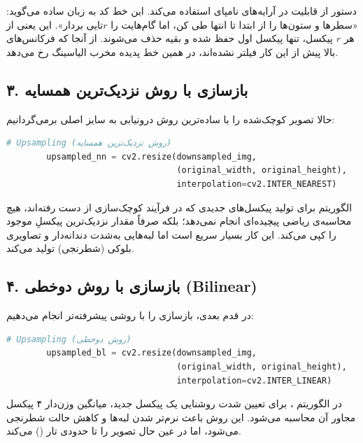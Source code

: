 دستور  از قابلیت  در آرایه‌های نامپای استفاده می‌کند. این خط کد به زبان ساده می‌گوید: «سطرها و ستون‌ها را از ابتدا تا انتها طی کن، اما گام‌هایت را $r$تایی بردار». این یعنی از هر $r$ پیکسل، تنها پیکسل اول حفظ شده و بقیه حذف می‌شوند. از آنجا که فرکانس‌های بالا پیش از این کار فیلتر نشده‌اند، در همین خط پدیده مخرب الیاسینگ رخ می‌دهد.

\subsection*{۳. بازسازی با روش نزدیک‌ترین همسایه }
حالا تصویر کوچک‌شده را با ساده‌ترین روش درونیابی به سایز اصلی برمی‌گردانیم:

\begin{codebox}
\begin{lstlisting}[language=Python]
        # Upsampling (روش نزدیک‌ترین همسایه)
        upsampled_nn = cv2.resize(downsampled_img, 
                                  (original_width, original_height), 
                                  interpolation=cv2.INTER_NEAREST)
\end{lstlisting}
\end{codebox}

الگوریتم  برای تولید پیکسل‌های جدیدی که در فرآیند کوچک‌سازی از دست رفته‌اند، هیچ محاسبه‌ی ریاضی پیچیده‌ای انجام نمی‌دهد؛ بلکه صرفاً مقدار نزدیک‌ترین پیکسلِ موجود را کپی می‌کند. این کار بسیار سریع است اما لبه‌هایی به‌شدت دندانه‌دار و تصاویری بلوکی (شطرنجی) تولید می‌کند.

\subsection*{۴. بازسازی با روش دوخطی (Bilinear)}
در قدم بعدی، بازسازی را با روشی پیشرفته‌تر انجام می‌دهیم:

\begin{codebox}
\begin{lstlisting}[language=Python]
        # Upsampling (روش دوخطی)
        upsampled_bl = cv2.resize(downsampled_img, 
                                  (original_width, original_height), 
                                  interpolation=cv2.INTER_LINEAR)
\end{lstlisting}
\end{codebox}

در الگوریتم ، برای تعیین شدت روشنایی یک پیکسل جدید، میانگین وزن‌دار ۴ پیکسل مجاور آن محاسبه می‌شود. این روش باعث نرم‌تر شدن لبه‌ها و کاهش حالت شطرنجی می‌شود، اما در عین حال تصویر را تا حدودی تار () می‌کند.

